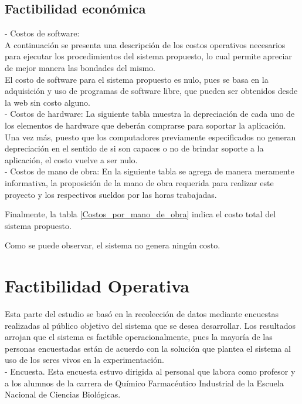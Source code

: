 \subsection{Factibilidad económica}
- Costos de software:\\
A continuación se presenta una descripción de los costos operativos necesarios para ejecutar los procedimientos del sistema propuesto, lo cual permite apreciar de mejor manera las bondades del mismo.\\

El costo de software para el sistema propuesto es nulo, pues se basa en la adquisición y uso de programas de software libre, que pueden ser obtenidos desde la web sin costo alguno.\\

- Costos de hardware:
La siguiente tabla muestra la depreciación de cada uno de los elementos de hardware que deberán comprarse para soportar la aplicación.\\


Una vez más, puesto que los computadores previamente especificados no generan depreciación en el sentido de si son capaces o no de brindar soporte a la aplicación, el costo vuelve a ser nulo.\\

- Costos de mano de obra:
En la siguiente tabla se agrega de manera meramente informativa, la proposición de la mano de obra requerida para realizar este proyecto y los respectivos sueldos por las horas trabajadas.

Finalmente, la tabla \ref{Costos_por_mano_de_obra} indica el costo total del sistema propuesto.

Como se puede observar, el sistema no genera ningún costo.

\section{Factibilidad Operativa}
Esta parte del estudio se basó en la recolección de datos mediante encuestas realizadas al público objetivo del sistema que se desea desarrollar.
Los resultados arrojan que el sistema es factible operacionalmente, pues la mayoría de las personas encuestadas están de acuerdo con la solución que plantea el sistema al uso de los seres vivos en la experimentación.\\

- Encuesta.
Esta encuesta estuvo dirigida al personal que labora como profesor y a los alumnos de la carrera de Químico Farmacéutico Industrial de la Escuela Nacional de Ciencias Biológicas.\\

